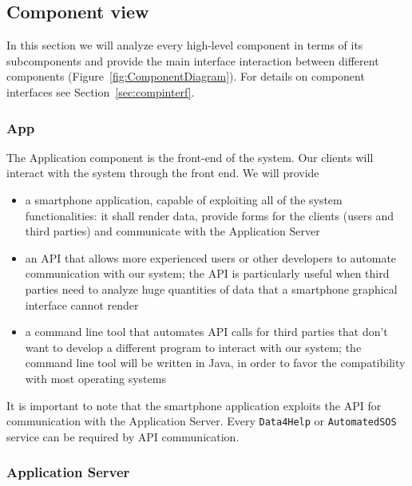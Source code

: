 \documentclass[../DD0.tex]{subfiles}
\begin{document}
  \subsection{Component view}
  \label{sec:compview}

    In this section we will analyze every high-level component in terms of its subcomponents and provide the main interface interaction between different components (Figure~\ref{fig:ComponentDiagram}). For details on component interfaces see Section~\ref{sec:compinterf}.

      \subsubsection{App}

        The Application component is the front-end of the system. Our clients will interact with the system through the front end. We will provide
        \begin{itemize}
          \item a smartphone application, capable of exploiting all of the system functionalities: it shall render data, provide forms for the clients (users and third parties) and communicate with the Application Server

          \item an API that allows more experienced users or other developers to automate communication with our system; the API is particularly useful when third parties need to analyze huge quantities of data that a smartphone graphical interface cannot render

          \item a command line tool that automates API calls for third parties that don't want to develop a different program to interact with our system; the command line tool will be written in Java, in order to favor the compatibility with most operating systems
        \end{itemize}

        It is important to note that the smartphone application exploits the API for communication with the Application Server. Every \texttt{Data4Help} or \texttt{AutomatedSOS} service can be required by API communication.

      \subsubsection{Application Server}
      \label{sec:applserverinterf}
\end{document}
